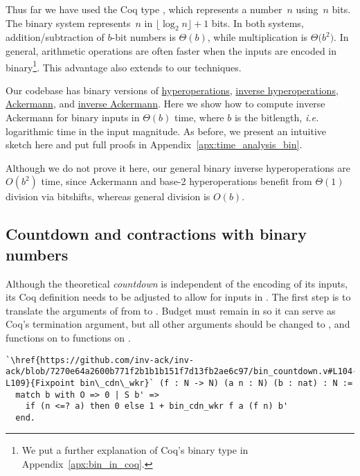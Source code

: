 Thus far we have used the Coq type , which represents
a number~$n$ using~$n$ bits.
The binary system represents~$n$ in $\lfloor \log_{2} n \rfloor + 1$ bits.
In both systems, addition/subtraction of $b$-bit
numbers is $\Theta(b)$, while multiplication is $\Theta \big(b^2\big)$.
In general, arithmetic operations are often faster when the inputs
are encoded in binary\footnote{We put a further explanation of
Coq's binary type  in Appendix~\ref{apx:bin_in_coq}.}.
This advantage also extends to our techniques.

Our codebase has binary versions of
	\href{https://github.com/inv-ack/inv-ack/blob/7270e64a2600b771f2b1b1b151f7d13fb2ae6c97/bin_repeater.v\#L78-L87}{hyperoperations},
	\href{https://github.com/inv-ack/inv-ack/blob/7270e64a2600b771f2b1b1b151f7d13fb2ae6c97/bin_applications.v\#L30-L36}{inverse hyperoperations},
	\href{https://github.com/inv-ack/inv-ack/blob/7270e64a2600b771f2b1b1b151f7d13fb2ae6c97/bin_repeater.v\#L157-L175}{Ackermann}, and
	\href{https://github.com/inv-ack/inv-ack/blob/7270e64a2600b771f2b1b1b151f7d13fb2ae6c97/bin_inv_ack.v\#L335-L342}{inverse Ackermann}.
Here we show how to compute inverse Ackermann for binary inputs in
$\Theta(b)$ time, where $b$ is the bitlength,
\emph{i.e.} logarithmic time in the input magnitude.
As before, we present an intuitive sketch here and put
full proofs in Appendix~\ref{apx:time_analysis_bin}.

\begin{rem}
Although we do not prove it here, our general binary inverse hyperoperations are $O(b^2)$ time,
since Ackermann and base-2 hyperoperations benefit from $\Theta(1)$ division via bitshifts,
whereas general division is $O(b)$.
\end{rem}

\subsection{Countdown and contractions with binary numbers}

\renewcommand{\Tleb}{\runtime_{\li{N.leb}}}
\renewcommand{\Tsucc}{\runtime_{\li{N.succ}}}

Although the theoretical \emph{countdown} is independent of the encoding
of its inputs, its Coq definition needs to be adjusted to allow for inputs
in . The first step is to translate the arguments of
 from  to . Budget  must
remain in  so it can serve as Coq's termination argument,
but all other  arguments should be changed
to , and functions on  to functions on .
\begin{lstlisting}
`\href{https://github.com/inv-ack/inv-ack/blob/7270e64a2600b771f2b1b1b151f7d13fb2ae6c97/bin_countdown.v#L104-L109}{Fixpoint bin\_cdn\_wkr}` (f : N -> N) (a n : N) (b : nat) : N :=
  match b with O => 0 | S b' =>
    if (n <=? a) then 0 else 1 + bin_cdn_wkr f a (f n) b'
  end.
\end{lstlisting}

